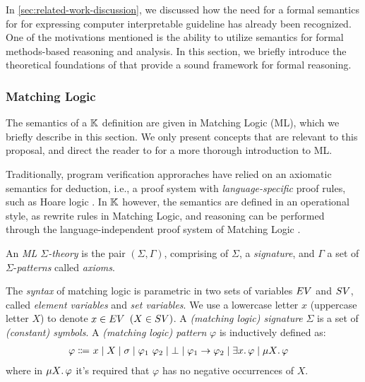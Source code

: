 In \autoref{sec:related-work-discussion}, we discussed how
the need for a formal semantics for \DSLs{} for expressing
computer interpretable guideline has already been recognized.
One of the motivations mentioned is the ability to utilize
semantics for formal methods-based reasoning and analysis.
In this section, we briefly introduce the theoretical foundations
of \K{} that provide a sound framework for formal reasoning.

\subsubsection{Matching Logic}

The semantics of a $\mathbb{K}$ definition are given in
Matching Logic (ML), which we briefly
describe in this section. We only present concepts that are
relevant to this proposal, and direct the reader to \cite{RosuLMCS17,ChenLICS19}
for a more thorough introduction to ML.

Traditionally, program verification approraches have
relied on an axiomatic semantics for deduction, i.e., a proof system with
\emph{language-specific} proof rules, such as Hoare logic \cite{HoareACM69}.
In $\mathbb{K}$ however, the semantics are defined in an operational style, as
rewrite rules in Matching Logic, and reasoning can be performed through
the language-independent proof system of Matching Logic \cite{MatchingLogicUrl}.


An \emph{ML $\Sigma$-theory} is the pair $\left(\Sigma, \Gamma\right)$,
comprising of $\Sigma$, a \emph{signature}, and $\Gamma$ a set of
$\Sigma$-\emph{patterns} called \emph{axioms}.

The \emph{syntax} of matching logic is parametric in two sets of variables
$EV$ and $SV$,
called \emph{element variables} and \emph{set variables}. We use
a lowercase letter $x$ (uppercase letter $X$) to denote $x \in EV$ $(X \in SV)$.
A \emph{(matching logic) signature} $\Sigma$ is a set of \emph{(constant)
  symbols}. A \emph{(matching logic) pattern} $\varphi$ is inductively defined as:
\begin{align*}
\varphi \Coloneqq\
& x
\mid X
\mid \sigma
\mid \varphi_1 \  \varphi_2
\mid \bot
\mid \varphi_1 \imp \varphi_2
\mid \exists x \ld \varphi
\mid \mu X \ld \varphi %
\end{align*}
where in $\mu X \mathord{.\,} \varphi$ it's required that $\varphi$ has no negative occurrences of $X$.

